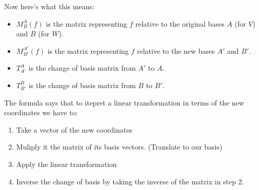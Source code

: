 Now here’s what this means:

\begin{itemize}[label=\(-\)]
\item \( M_{B}^{A}(f) \) is the matrix representing \( f \) relative to the original bases \( A \) (for \( V \)) and \( B \) (for \( W \)).
\item \( M_{B'}^{A'}(f) \) is the matrix representing \( f \) relative to the new bases \( A' \) and \( B' \).
\item\( T_{A'}^{A} \) is the change of basis matrix from \( A' \) to \( A \).
\item \( T_{B'}^{B} \) is the change of basis matrix from \( B \) to \( B' \).
\end{itemize}

The formula says that to itepret a linear transformation in terms of the
new coordinates we have to:
\begin{enumerate}
    \item Take a vector of the new coordinates
    \item Muliply it the matrix of its basis vectors. (Translate to our basis)
    \item Apply the linear transformation
    \item Inverse the change of basis by taking the inverse of the 
    matrix in step 2.
\end{enumerate}

\newpage